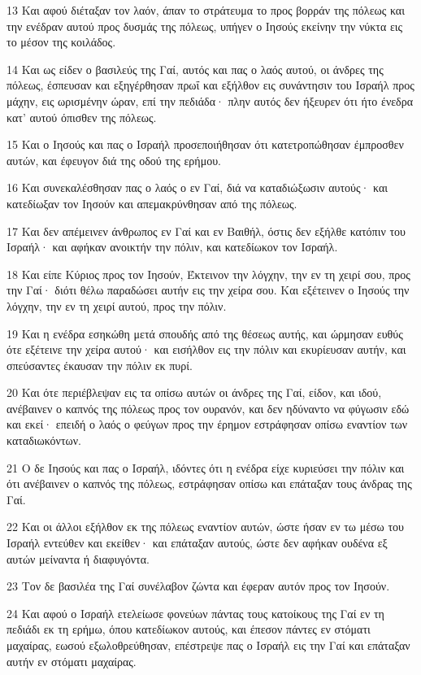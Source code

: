 \par 13 Και αφού διέταξαν τον λαόν, άπαν το στράτευμα το προς βορράν της πόλεως και την ενέδραν αυτού προς δυσμάς της πόλεως, υπήγεν ο Ιησούς εκείνην την νύκτα εις το μέσον της κοιλάδος.
\par 14 Και ως είδεν ο βασιλεύς της Γαί, αυτός και πας ο λαός αυτού, οι άνδρες της πόλεως, έσπευσαν και εξηγέρθησαν πρωΐ και εξήλθον εις συνάντησιν του Ισραήλ προς μάχην, εις ωρισμένην ώραν, επί την πεδιάδα· πλην αυτός δεν ήξευρεν ότι ήτο ένεδρα κατ' αυτού όπισθεν της πόλεως.
\par 15 Και ο Ιησούς και πας ο Ισραήλ προσεποιήθησαν ότι κατετροπώθησαν έμπροσθεν αυτών, και έφευγον διά της οδού της ερήμου.
\par 16 Και συνεκαλέσθησαν πας ο λαός ο εν Γαί, διά να καταδιώξωσιν αυτούς· και κατεδίωξαν τον Ιησούν και απεμακρύνθησαν από της πόλεως.
\par 17 Και δεν απέμεινεν άνθρωπος εν Γαί και εν Βαιθήλ, όστις δεν εξήλθε κατόπιν του Ισραήλ· και αφήκαν ανοικτήν την πόλιν, και κατεδίωκον τον Ισραήλ.
\par 18 Και είπε Κύριος προς τον Ιησούν, Έκτεινον την λόγχην, την εν τη χειρί σου, προς την Γαί· διότι θέλω παραδώσει αυτήν εις την χείρα σου. Και εξέτεινεν ο Ιησούς την λόγχην, την εν τη χειρί αυτού, προς την πόλιν.
\par 19 Και η ενέδρα εσηκώθη μετά σπουδής από της θέσεως αυτής, και ώρμησαν ευθύς ότε εξέτεινε την χείρα αυτού· και εισήλθον εις την πόλιν και εκυρίευσαν αυτήν, και σπεύσαντες έκαυσαν την πόλιν εκ πυρί.
\par 20 Και ότε περιέβλεψαν εις τα οπίσω αυτών οι άνδρες της Γαί, είδον, και ιδού, ανέβαινεν ο καπνός της πόλεως προς τον ουρανόν, και δεν ηδύναντο να φύγωσιν εδώ και εκεί· επειδή ο λαός ο φεύγων προς την έρημον εστράφησαν οπίσω εναντίον των καταδιωκόντων.
\par 21 Ο δε Ιησούς και πας ο Ισραήλ, ιδόντες ότι η ενέδρα είχε κυριεύσει την πόλιν και ότι ανέβαινεν ο καπνός της πόλεως, εστράφησαν οπίσω και επάταξαν τους άνδρας της Γαί.
\par 22 Και οι άλλοι εξήλθον εκ της πόλεως εναντίον αυτών, ώστε ήσαν εν τω μέσω του Ισραήλ εντεύθεν και εκείθεν· και επάταξαν αυτούς, ώστε δεν αφήκαν ουδένα εξ αυτών μείναντα ή διαφυγόντα.
\par 23 Τον δε βασιλέα της Γαί συνέλαβον ζώντα και έφεραν αυτόν προς τον Ιησούν.
\par 24 Και αφού ο Ισραήλ ετελείωσε φονεύων πάντας τους κατοίκους της Γαί εν τη πεδιάδι εκ τη ερήμω, όπου κατεδίωκον αυτούς, και έπεσον πάντες εν στόματι μαχαίρας, εωσού εξωλοθρεύθησαν, επέστρεψε πας ο Ισραήλ εις την Γαί και επάταξαν αυτήν εν στόματι μαχαίρας.
